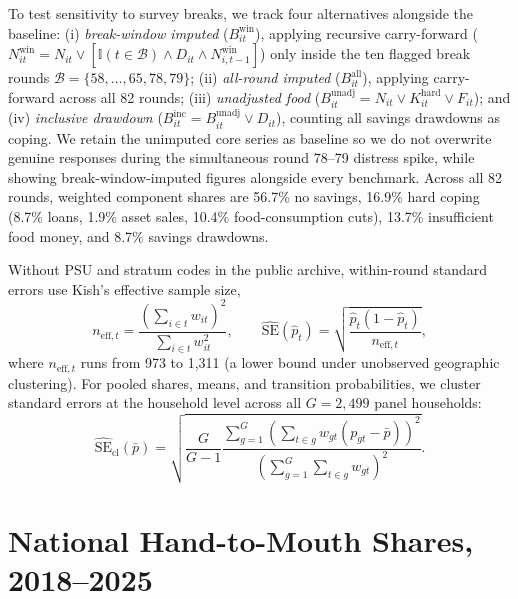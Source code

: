\documentclass[11pt]{article}
\begin{document}
To test sensitivity to survey breaks, we track four alternatives alongside the baseline: (i) \textit{break-window imputed} ($B_{it}^{\text{win}}$), applying recursive carry-forward ($N_{it}^{\text{win}} = N_{it} \lor [\mathbb{I}(t \in \mathcal{B}) \land D_{it} \land N_{i,t-1}^{\text{win}}]$) only inside the ten flagged break rounds $\mathcal{B} = \{58, \dots, 65, 78, 79\}$; (ii) \textit{all-round imputed} ($B_{it}^{\text{all}}$), applying carry-forward across all 82 rounds; (iii) \textit{unadjusted food} ($B_{it}^{\text{unadj}} = N_{it} \lor K_{it}^{\text{hard}} \lor F_{it}$); and (iv) \textit{inclusive drawdown} ($B_{it}^{\text{inc}} = B_{it}^{\text{unadj}} \lor D_{it}$), counting all savings drawdowns as coping. We retain the unimputed core series as baseline so we do not overwrite genuine responses during the simultaneous round 78--79 distress spike, while showing break-window-imputed figures alongside every benchmark. Across all 82 rounds, weighted component shares are 56.7\% no savings, 16.9\% hard coping (8.7\% loans, 1.9\% asset sales, 10.4\% food-consumption cuts), 13.7\% insufficient food money, and 8.7\% savings drawdowns.

Without PSU and stratum codes in the public archive, within-round standard errors use Kish's effective sample size,
\begin{equation}\label{eq:kish}
n_{\text{eff},t} = \frac{\left(\sum_{i \in t} w_{it}\right)^2}{\sum_{i \in t} w_{it}^2}, \qquad \widehat{\text{SE}}(\hat{p}_t) = \sqrt{\frac{\hat{p}_t (1 - \hat{p}_t)}{n_{\text{eff},t}}},
\end{equation}
where $n_{\text{eff},t}$ runs from 973 to 1,311 (a lower bound under unobserved geographic clustering). For pooled shares, means, and transition probabilities, we cluster standard errors at the household level across all $G = 2{,}499$ panel households:
\begin{equation}\label{eq:clse}
\widehat{\text{SE}}_{\text{cl}}(\bar{p}) = \sqrt{\frac{G}{G-1} \frac{\sum_{g=1}^{G} \left(\sum_{t \in g} w_{gt}(p_{gt} - \bar{p})\right)^2}{\left(\sum_{g=1}^{G}\sum_{t \in g} w_{gt}\right)^2}}.
\end{equation}

\section{National Hand-to-Mouth Shares, 2018--2025}\label{sec:series}
\end{document}

